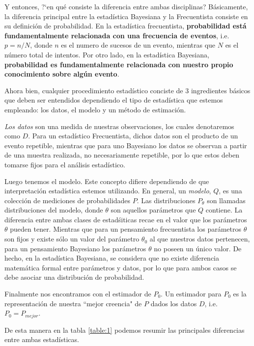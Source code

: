 \documentclass[onecolumn,           %
               showpacs,            %
               preprintnumbers,     %
               aps,                 %
               prl,          	    %
               letterpaper,             %
               superscriptaddress,      %
               nofootinbib,         %
               tightenlines,        %
               floats,floatfix      %
               ,usenatbib,
               ]{revtex4-1}
\begin{document}
Y entonces, ?`en qu\'e consiste la diferencia entre ambas disciplinas? B\'asicamente, la diferencia principal entre la estad\'istica Bayesiana y la Frecuentista consiste  en su definici\'on de probabilidad. En la estad\'istica frecuentista, \textbf{probabilidad est\'a fundamentalmente relacionada con una frecuencia de eventos}, i.e. $p=n/N$, donde $n$ es el numero de sucesos de un evento, mientras que $N$ es el n\'umero total de intentos. Por otro lado, en la estad\'istica Bayesiana, \textbf{probabilidad es fundamentalmente relacionada con nuestro propio conocimiento sobre alg\'un evento}.

Ahora bien, cualquier procedimiento estad\'istico  conciste de 3 ingredientes b\'asicos que deben ser entendidos dependiendo el tipo de estad\'istica que estemos empleando:  los datos, el modelo y un m\'etodo de estimaci\'on.

\textit{Los datos} son una medida de nuestras observaciones, los cuales denotaremos como $D$. Para un estad\'istico Frecuentista, dichos datos son el producto de un evento repetible, mientras que para uno Bayesiano los datos se observan a partir de una muestra realizada, no necesariamente repetible, por lo que estos deben tomarse fijos para el an\'alisis estad\'istico.

Luego tenemos el modelo. Este concepto difiere dependiendo de que interpretaci\'on estad\'istica estemos utilizando. En general, un \textit{modelo}, $Q$, es una colecci\'on de mediciones de probabilidades $P$. Las distribuciones $P_\theta$ son llamadas distribuciones del modelo, donde $\theta$ son aquellos par\'ametros que $Q$ contiene. La diferencia entre ambas clases de estad\'siticas recae en el valor que los par\'ametros $\theta$ pueden tener. Mientras que para un pensamiento frecuentista los par\'ametros $\theta$ son fijos y existe s\'olo un valor del par\'ametro $\theta_0$ al que nuestros datos pertenecen, para un pensamiento Bayesiano los par\'ametros $\theta$ no poseen un \'unico valor. De hecho, en la estad\'istica Bayesiana, se considera que no existe diferencia matem\'atica formal entre par\'ametros y datos, por lo que para ambos casos se debe asociar una distribuci\'on de probabilidad.

Finalmente nos encontramos con el estimador de $P_0$. Un estimador para $P_0$ es la representaci\'on de nuestra ``mejor creencia" de $P$ dados los datos $D$, i.e. $P_0 = P_{mejor}$. 

De esta manera en la tabla \ref{table:1} podemos resumir las principales diferencias entre ambas estad\'isticas. 
\end{document}
